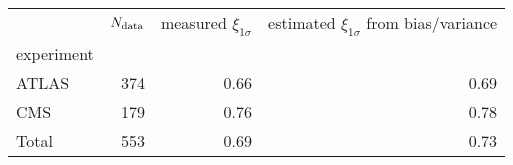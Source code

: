 \begin{center}
    \begin{tabular}{lrrr}
        \toprule
        {} &  $N_{\rm data}$ &  measured $\xi_{1\sigma}$ &  estimated $\xi_{1\sigma}$ from bias/variance \\
        experiment &        &                           &                                                  \\
        \midrule
        ATLAS      &    374 &                      0.66 &                                             0.69 \\
        CMS        &    179 &                      0.76 &                                             0.78 \\
        Total      &    553 &                      0.69 &                                             0.73 \\
        \bottomrule
        \end{tabular}
\end{center}
